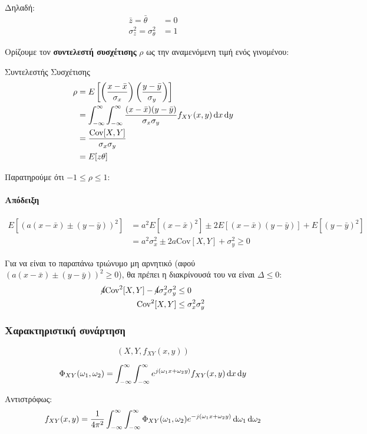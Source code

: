 \documentclass[11pt,a4paper,notitlepage,fleqn,final]{article}
\begin{document}
Δηλαδή:
\begin{align*}
\bar z = \bar \theta &= 0 \\
\sigma_z^2 = \sigma_\theta^2 &= 1
\end{align*}

Ορίζουμε τον \textbf{συντελεστή συσχέτισης} \( \rho \) ως την αναμενόμενη
τιμή ενός γινομένου:
\begin{defn}{Συντελεστής Συσχέτισης}{}
	\begin{align*}
	\rho &= E\left[\left(
	\frac{x-\bar x}{\sigma_x}
	\right)\left(
	\frac{y-\bar y}{\sigma_y}
	\right)
	\right] \\ &= \int_{-\infty}^{\infty} \int_{-\infty}^{\infty}
	\frac{(x-\bar x)(y-\bar y)}{\sigma_x \sigma_y}f_{XY}(x,y)\mathop{}\!\mathrm{d} x
	\mathop{}\!\mathrm{d} y \\
	&= \frac{\mathrm{Cov}[X,Y]}{\sigma_x\sigma_y}\\
	&= E[z\theta]
	\end{align*}
\end{defn}

Παρατηρούμε ότι \( -1 \leq \rho \leq 1 \):
\paragraph{Απόδειξη}
\begin{align*}
E\left[
\left(a(x-\bar x)\pm (y-\bar y)\right)^2
\right] &=
a^2E\left[(x-\bar x)^2\right] \pm 2E\left[(x-\bar x)(y-\bar y)\right]
+E\left[(y-\bar y)^2\right]
\\ &= a^2\sigma_x^2 \pm 2a\mathrm{Cov}[X,Y] + \sigma_y^2 \geq 0
\end{align*}

Για να είναι το παραπάνω τριώνυμο μη αρνητικό
(αφού \( \left(a(x-\bar x)\pm(y-\bar y)\right)^2 \geq 0 \)),
θα πρέπει η διακρίνουσά
του να είναι \( \Delta \leq 0 \):
\begin{align*}
	\cancel{4}\mathrm{Cov}^2[X,Y]-\cancel{4}\sigma_x^2\sigma_y^2 &\leq 0
	\\
	\mathrm{Cov}^2[X,Y]&\leq \sigma_x^2\sigma_y^2
\end{align*}

\subsubsection{Χαρακτηριστική συνάρτηση}
\[
(X,Y,f_{XY}(x,y))
\]
\begin{defn}{}{}
    \[
    \Phi_{XY}(\omega_1,\omega_2) = \int_{-\infty}^{\infty} \int_{-\infty}^{\infty}
    e^{j(\omega_1 x + \omega_2 y)} f_{XY}(x,y)\mathop{}\!\mathrm{d} x\mathop{}\!\mathrm{d} y
    \]
\end{defn}
Αντιστρόφως:\[
f_{XY}(x,y) = \frac{1}{4\pi^2} \int_{-\infty}^{\infty}
\int_{-\infty}^{\infty}
\Phi_{XY}(\omega_1,\omega_2) e^{-j(\omega_1 x + \omega_2 y)}
\mathop{}\!\mathrm{d} \omega_1 \mathop{}\!\mathrm{d} \omega_2
\]
\end{document}
